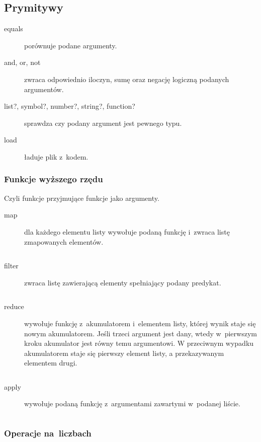 \documentclass[a4paper,11pt]{article}
\newcommand{\clj}[1]{
\inputminted[fontsize=\footnotesize,frame=single,samepage=true]{clojure}{code/#1.clj}
}
\begin{document}
\subsection{Prymitywy}

\begin{description}
\item[equals] porównuje podane argumenty.

\item[and, or, not] zwraca odpowiednio iloczyn, sumę oraz negację logiczną
  podanych argumentów.

\item[list?, symbol?, number?, string?, function?] sprawdza czy podany argument
  jest pewnego typu.

\item[load] ładuje plik z~kodem.
\end{description}

\subsubsection{Funkcje wyższego rzędu}

Czyli funkcje przyjmujące funkcje jako argumenty.

\begin{description}
\item[map] dla każdego elementu listy wywołuje podaną funkcję i~zwraca listę
  zmapowanych elementów.
  \clj{map}

\item[filter] zwraca listę zawierającą elementy spełniający podany predykat.
  \clj{filter}

\item[reduce] wywołuje funkcję z~akumulatorem i~elementem listy, której wynik
  staje się nowym akumulatorem. Jeśli trzeci argument jest dany, wtedy
  w~pierwszym kroku akumulator jest równy temu argumentowi. W przeciwnym
  wypadku akumulatorem staje się pierwszy element listy, a przekazywanym
  elementem drugi.
  \clj{reduce}

\item[apply] wywołuje podaną funkcję z~argumentami zawartymi w~podanej liście.
  \clj{apply}

\end{description}

\subsubsection{Operacje na~liczbach}
\end{document}
